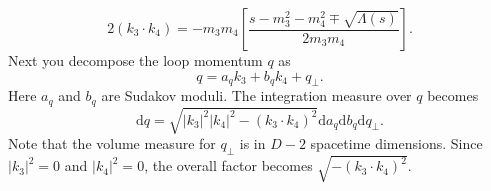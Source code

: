 \begin{equation}
	2 (k_{3} \cdot k_{4}) = -m_{3} m_{4} \left[ \frac{s - m_{3}^{2} - m_{4}^{2} \mp \sqrt{\Lambda(s)}}{2 m_{3} m_{4}} \right].
\end{equation}
Next you decompose the loop momentum $q$ as
\begin{equation}
	q = a_{q} k_{3} + b_{q} k_{4} + q_{\perp}.
\end{equation}
Here $a_{q}$ and $b_{q}$ are Sudakov moduli. The integration measure over $q$ becomes
\begin{equation}
	\mathrm{d}q = \sqrt{|k_{3}|^{2} |k_{4}|^{2} - (k_{3} \cdot k_{4})^{2}} \mathrm{d}a_{q} \mathrm{d}b_{q} \mathrm{d}q_{\perp}.
\end{equation}
Note that the volume measure for $q_{\perp}$ is in $D-2$ spacetime dimensions. Since $|k_{3}|^{2} = 0$ and $|k_{4}|^{2} = 0$, the overall factor becomes $\sqrt{-(k_{3} \cdot k_{4})^{2}}$.

